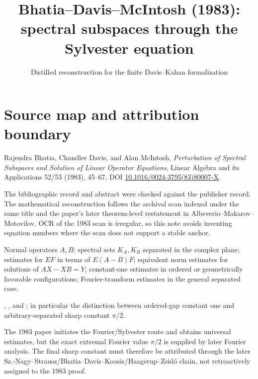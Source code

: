 
\title{Bhatia--Davis--McIntosh (1983): spectral subspaces through the Sylvester equation}
\author{}
\date{Distilled reconstruction for the finite Davis--Kahan formalization}

\maketitle

\section*{Source map and attribution boundary}
\begin{sourceguide}
\item[Primary source] Rajendra Bhatia, Chandler Davis, and Alan McIntosh, \emph{Perturbation of Spectral Subspaces and Solution of Linear Operator Equations}, Linear Algebra and its Applications 52/53 (1983), 45--67, DOI \href{https://doi.org/10.1016/0024-3795(83)80007-X}{10.1016/0024-3795(83)80007-X}.
\item[Source evidence] The bibliographic record and abstract were checked against the publisher record. The mathematical reconstruction follows the archival scan indexed under the same title and the paper's later theorem-level restatement in Albeverio--Makarov--Motovilov. OCR of the 1983 scan is irregular, so this note avoids inventing equation numbers where the scan does not support a stable anchor.
\item[Paper scope] Normal operators $A,B$; spectral sets $K_A,K_B$ separated in the complex plane; estimates for $EF$ in terms of $E(A-B)F$; equivalent norm estimates for solutions of $AX-XB=Y$; constant-one estimates in ordered or geometrically favorable configurations; Fourier-transform estimates in the general separated case.
\item[Formalization target] , , and ; in particular the distinction between ordered-gap constant one and arbitrary-separated sharp constant $\pi/2$.
\item[Historical boundary] The 1983 paper initiates the Fourier/Sylvester route and obtains universal estimates, but the exact extremal Fourier value $\pi/2$ is supplied by later Fourier analysis. The final sharp constant must therefore be attributed through the later Sz.-Nagy--Strausz/Bhatia--Davis--Koosis/Haagerup--Zsidó chain, not retroactively assigned to the 1983 proof.
\end{sourceguide}


